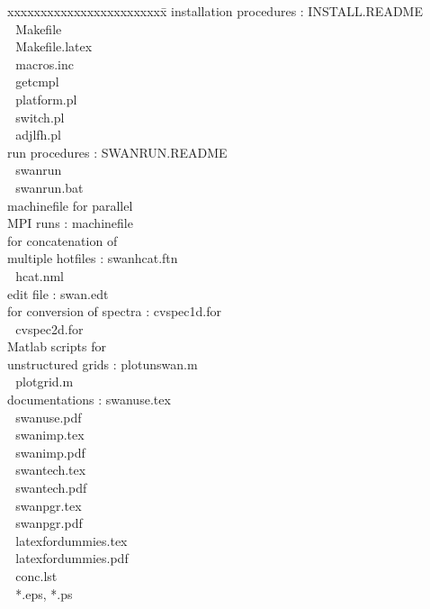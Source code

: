 \documentclass[12pt]{book}
\begin{document}
\begin{tabbing}
xxxxxxxxxxxxxxxxxxxxxxxx\= \kill
installation procedures   \>:       INSTALL.README \\
                          \> $\,\,$ Makefile \\
                          \> $\,\,$ Makefile.latex \\
                          \> $\,\,$ macros.inc \\
                          \> $\,\,$ getcmpl \\
                          \> $\,\,$ platform.pl \\
                          \> $\,\,$ switch.pl \\
                          \> $\,\,$ adjlfh.pl \\
run procedures            \>:       SWANRUN.README \\
                          \> $\,\,$ swanrun \\
                          \> $\,\,$ swanrun.bat \\
machinefile for parallel  \> $\,\,$ \\
MPI runs                  \>:       machinefile \\
for concatenation of      \> $\,\,$ \\
multiple hotfiles         \>:       swanhcat.ftn \\
                          \> $\,\,$ hcat.nml \\
edit file                 \>:       swan.edt \\
for conversion of spectra \>:       cvspec1d.for \\
                          \> $\,\,$ cvspec2d.for \\
Matlab scripts for        \> $\,\,$ \\
unstructured grids        \>:       plotunswan.m \\
                          \> $\,\,$ plotgrid.m \\
documentations            \>:       swanuse.tex \\
                          \> $\,\,$ swanuse.pdf \\
                          \> $\,\,$ swanimp.tex \\
                          \> $\,\,$ swanimp.pdf \\
                          \> $\,\,$ swantech.tex \\
                          \> $\,\,$ swantech.pdf \\
                          \> $\,\,$ swanpgr.tex \\
                          \> $\,\,$ swanpgr.pdf \\
                          \> $\,\,$ latexfordummies.tex \\
                          \> $\,\,$ latexfordummies.pdf \\
                          \> $\,\,$ conc.lst \\
                          \> $\,\,$ *.eps, *.ps \\
\end{tabbing}
\end{document}
